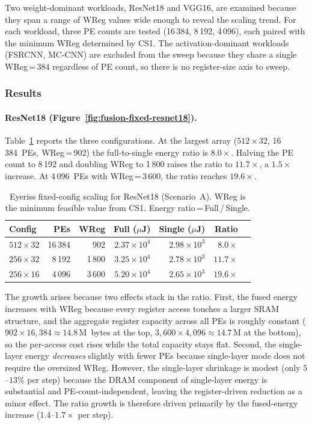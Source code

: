 Two weight-dominant workloads, ResNet18 and VGG16, are examined
because they span a range of WReg values wide enough to reveal the scaling trend.
For each workload, three PE counts are tested
(16\,384, 8\,192, 4\,096), each paired with the minimum WReg determined by CS1.
The activation-dominant workloads (FSRCNN, MC-CNN) are excluded
from the sweep because they share a single WReg\,=\,384
regardless of PE count, so there is no register-size axis to
sweep.

\subsubsection{Results}

\paragraph{ResNet18 (Figure~\ref{fig:fusion-fixed-resnet18}).}
Table~\ref{tab:fusion-fixed-resnet18} reports the three
configurations.
At the largest array ($512 \times 32$, 16\,384~PEs, WReg\,=\,902)
the full-to-single energy ratio is $8.0\times$.
Halving the PE count to 8\,192 and doubling WReg to 1\,800
raises the ratio to $11.7\times$, a $1.5\times$ increase.
At 4\,096~PEs with WReg\,=\,3\,600, the ratio reaches
$19.6\times$.

\begin{table}[htbp]
  \centering
  \caption{Eyeriss fixed-config scaling for ResNet18 (Scenario~A).
    WReg is the minimum feasible value from CS1.
    Energy ratio\,=\,Full\,/\,Single.}
  \label{tab:fusion-fixed-resnet18}
  \begin{tabular}{lrrrrrr}
    \toprule
    Config & PEs & WReg
      & Full ($\mu$J) & Single ($\mu$J)
      & Ratio \\
    \midrule
    $512 \times 32$  & 16\,384 &    902
      & $2.37 \times 10^{4}$ & $2.98 \times 10^{3}$
      & $8.0\times$ \\
    $256 \times 32$  &  8\,192 &  1\,800
      & $3.25 \times 10^{4}$ & $2.78 \times 10^{3}$
      & $11.7\times$ \\
    $256 \times 16$  &  4\,096 &  3\,600
      & $5.20 \times 10^{4}$ & $2.65 \times 10^{3}$
      & $19.6\times$ \\
    \bottomrule
  \end{tabular}
\end{table}

The growth arises because two effects stack in the ratio.
First, the fused energy increases with WReg because every
register access touches a larger SRAM structure, and the
aggregate register capacity across all PEs is roughly constant
($902 \times 16{,}384 \approx 14.8$\,M~bytes at the top,
$3{,}600 \times 4{,}096 \approx 14.7$\,M at the bottom), so the
per-access cost rises while the total capacity stays flat.
Second, the single-layer energy \emph{decreases} slightly with
fewer PEs because single-layer mode does not require the
oversized WReg.
However, the single-layer shrinkage is modest (only
$5$--$13\%$ per step) because the DRAM component of single-layer
energy is substantial and PE-count-independent, leaving the
register-driven reduction as a minor effect.
The ratio growth is therefore driven primarily by the
fused-energy increase ($1.4$--$1.7\times$ per step).

